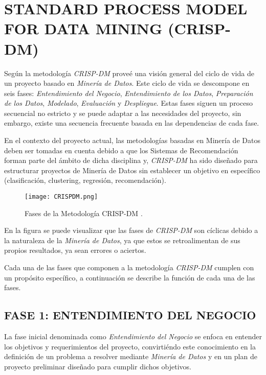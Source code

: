 \section{STANDARD PROCESS MODEL FOR DATA MINING (CRISP-DM)}

Según \parencite{wirth2000crisp} la metodología \textit{CRISP-DM} proveé una visión general del ciclo de vida de un proyecto basado en \textit{Minería de Datos}. Este ciclo de vida se descompone en seis fases: \textit{Entendimiento del Negocio}, \textit{Entendimiento de los Datos}, \textit{Preparación de los Datos}, \textit{Modelado}, \textit{Evaluación} y \textit{Despliegue}. Estas fases siguen un proceso secuencial no estricto y se puede adaptar a las necesidades del proyecto, sin embargo, existe una secuencia frecuente basada en las dependencias de cada fase.

En el contexto del proyecto actual, las metodologías basadas en Minería de Datos deben ser tomadas en cuenta debido a que los Sistemas de Recomendación forman parte del ámbito de dicha disciplina y, \textit{CRISP-DM} ha sido diseñado para estructurar proyectos de Minería de Datos sin establecer un objetivo en específico (clasificación, clustering, regresión, recomendación).

\begin{figure}[h!]
    \centering
    \texttt{[image: CRISPDM.png]}
    \caption{Fases de la Metodología CRISP-DM \parencite{wirth2000crisp}.}
    \label{fig:FasesCRISPDM}
\end{figure}

En la figura  se puede visualizar que las fases de \textit{CRISP-DM} son cíclicas debido a la naturaleza de la \textit{Minería de Datos}, ya que estos se retroalimentan de sus propios resultados, ya sean errores o aciertos.

Cada una de las fases que componen a la metodología \textit{CRISP-DM} cumplen con un propósito específico, a continuación se describe la función de cada una de las fases.

\subsection{FASE 1: ENTENDIMIENTO DEL NEGOCIO}
La fase inicial denominada como \textit{Entendimiento del Negocio} se enfoca en entender los objetivos y requerimientos del proyecto, convirtiéndo este conocimiento en la definición de un problema a resolver mediante \textit{Minería de Datos} y en un plan de proyecto preliminar diseñado para cumplir dichos objetivos.

